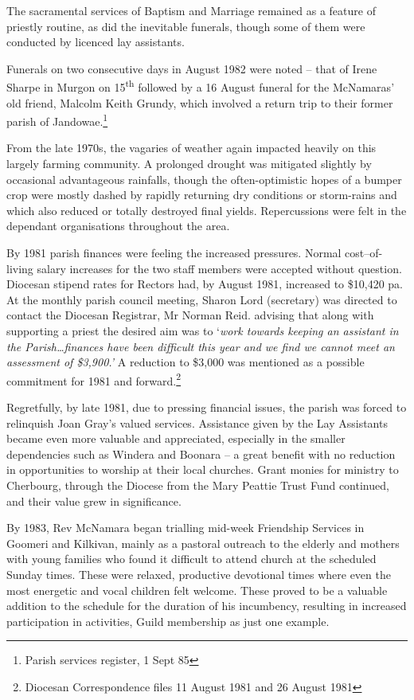 The sacramental services of Baptism and Marriage remained as a feature of priestly routine, as did the inevitable funerals, though some of them were conducted by licenced lay assistants.

Funerals on two consecutive days in August 1982 were noted -- that of Irene Sharpe in Murgon on 15\textsuperscript{th} followed by a 16 August funeral for the McNamaras' old friend, Malcolm Keith Grundy, which involved a return trip to their former parish of Jandowae.\footnote{Parish services register, 1 Sept 85}

From the late 1970s, the vagaries of weather again impacted heavily on this largely farming community. A prolonged drought was mitigated slightly by occasional advantageous rainfalls, though the often-optimistic hopes of a bumper crop were mostly dashed by rapidly returning dry conditions or storm-rains and which also reduced or totally destroyed final yields. Repercussions were felt in the dependant organisations throughout the area.

By 1981 parish finances were feeling the increased pressures. Normal cost--of-living salary increases for the two staff members were accepted without question. Diocesan stipend rates for Rectors had, by August 1981, increased to \$10,420 pa. At the monthly parish council meeting, Sharon Lord (secretary) was directed to contact the Diocesan Registrar, Mr Norman Reid. advising that along with supporting a priest the desired aim was to `\emph{work towards keeping an assistant in the Parish\ldots finances have been difficult this year and we find we cannot meet an assessment of \$3,900.'} A reduction to \$3,000 was mentioned as a possible commitment for 1981 and forward.\footnote{Diocesan Correspondence files 11 August 1981 and 26 August 1981}

Regretfully, by late 1981, due to pressing financial issues, the parish was forced to relinquish Joan Gray's valued services. Assistance given by the Lay Assistants became even more valuable and appreciated, especially in the smaller dependencies such as Windera and Boonara -- a great benefit with no reduction in opportunities to worship at their local churches. Grant monies for ministry to Cherbourg, through the Diocese from the Mary Peattie Trust Fund continued, and their value grew in significance.

By 1983, Rev McNamara began trialling mid-week Friendship Services in Goomeri and Kilkivan, mainly as a pastoral outreach to the elderly and mothers with young families who found it difficult to attend church at the scheduled Sunday times. These were relaxed, productive devotional times where even the most energetic and vocal children felt welcome. These proved to be a valuable addition to the schedule for the duration of his incumbency, resulting in increased participation in activities, Guild membership as just one example.

